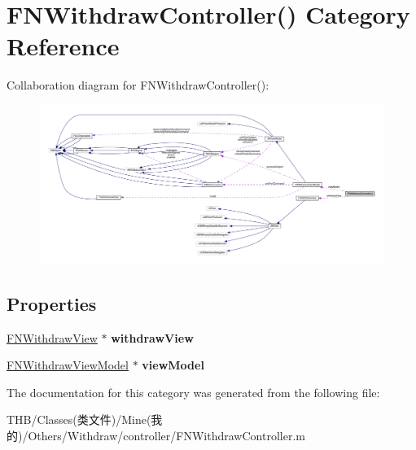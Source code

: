 \hypertarget{category_f_n_withdraw_controller_07_08}{}\section{F\+N\+Withdraw\+Controller() Category Reference}
\label{category_f_n_withdraw_controller_07_08}


Collaboration diagram for F\+N\+Withdraw\+Controller()\+:\nopagebreak
\begin{figure}[H]
\begin{center}
\leavevmode
\includegraphics[width=350pt]{category_f_n_withdraw_controller_07_08__coll__graph}
\end{center}
\end{figure}
\subsection*{Properties}
\begin{DoxyCompactItemize}
\item 
\mbox{\label{category_f_n_withdraw_controller_07_08_a66eab8ada50cd7fe43db8a2a4c8442a9}} 
\mbox{\hyperlink{interface_f_n_withdraw_view}{F\+N\+Withdraw\+View}} $\ast$ {\bfseries withdraw\+View}
\item 
\mbox{\label{category_f_n_withdraw_controller_07_08_a4e7eb2c79ad91efa56b2d20d3fde08ee}} 
\mbox{\hyperlink{interface_f_n_withdraw_view_model}{F\+N\+Withdraw\+View\+Model}} $\ast$ {\bfseries view\+Model}
\end{DoxyCompactItemize}


The documentation for this category was generated from the following file\+:\begin{DoxyCompactItemize}
\item 
T\+H\+B/\+Classes(类文件)/\+Mine(我的)/\+Others/\+Withdraw/controller/F\+N\+Withdraw\+Controller.\+m\end{DoxyCompactItemize}
